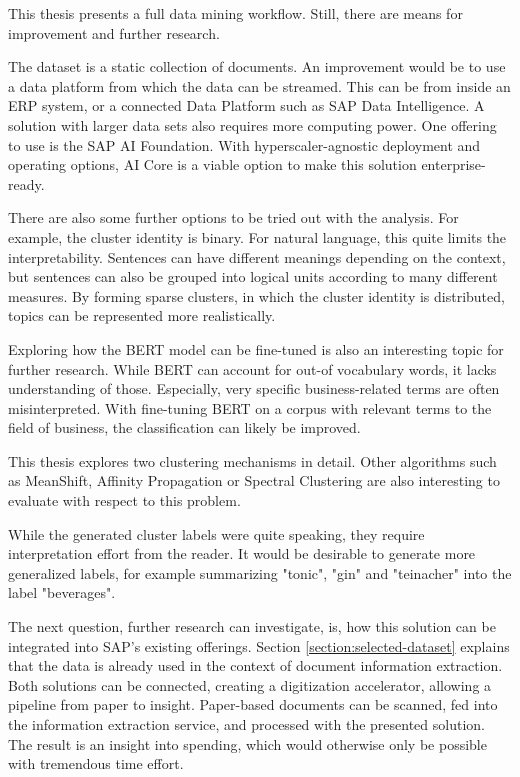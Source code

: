 This thesis presents a full data mining workflow. Still, there are means for improvement and further research.

The dataset is a static collection of documents. An improvement would be to use a data platform from which the data can be streamed. This can be from inside an \ac{ERP} system, or a connected Data Platform such as SAP Data Intelligence. A solution with larger data sets also requires more computing power. One offering to use is the SAP AI Foundation. With hyperscaler-agnostic deployment and operating options, AI Core is a viable option to make this solution enterprise-ready.

There are also some further options to be tried out with the analysis. For example, the cluster identity is binary. For natural language, this quite limits the interpretability. Sentences can have different meanings depending on the context, but sentences can also be grouped into logical units according to many different measures. By forming sparse clusters, in which the cluster identity is distributed, topics can be represented more realistically. 

Exploring how the \ac{BERT} model can be fine-tuned is also an interesting topic for further research. While \ac{BERT} can account for out-of vocabulary words, it lacks understanding of those. Especially, very specific business-related terms are often misinterpreted. With fine-tuning \ac{BERT} on a corpus with relevant terms to the field of business, the classification can likely be improved.

This thesis explores two clustering mechanisms in detail. Other algorithms such as MeanShift, Affinity Propagation or Spectral Clustering are also interesting to evaluate with respect to this problem.

While the generated cluster labels were quite speaking, they require interpretation effort from the reader. It would be desirable to generate more generalized labels, for example summarizing "tonic", "gin" and "teinacher" into the label "beverages".

The next question, further research can investigate, is, how this solution can be integrated into SAP's existing offerings. Section \ref{section:selected-dataset} explains that the data is already used in the context of document information extraction. Both solutions can be connected, creating a digitization accelerator, allowing a pipeline from paper to insight. Paper-based documents can be scanned, fed into the information extraction service, and processed with the presented solution. The result is an insight into spending, which would otherwise only be possible with tremendous time effort.



